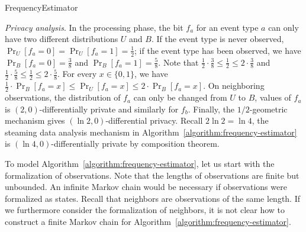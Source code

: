 \begin{algorithm}
  \begin{algorithmic}[1]
    \EndMatch
    \EndMatch
  \EndProcedure
  \end{algorithmic}
  \caption{FrequencyEstimator}
  \label{algorithm:frequency-estimator}
\end{algorithm}

\indent
\emph{Privacy analysis}.
In the processing phase, the bit $f_a$ for an event type $a$ can only
have two different distributions $U$ and $B$. If the event type is
never observed, $\Pr_U[f_a = 0] = \Pr_U[f_a = 1] = \frac{1}{2}$; if
the event type has been observed, we have $\Pr_B[f_a = 0] =
\frac{3}{8}$ and $\Pr_B[f_a = 1] = \frac{5}{8}$. Note that
$\frac{1}{2} \cdot \frac{3}{8} \leq \frac{1}{2} \leq 2 \cdot
\frac{3}{8}$ and $\frac{1}{2} \cdot \frac{5}{8} \leq \frac{1}{2} \leq
2 \cdot \frac{5}{8}$. For every $x \in \{ 0, 1 \}$, we have
$\frac{1}{2} \cdot \Pr_B[f_a = x] \leq \Pr_U[f_a = x] \leq 2 \cdot
\Pr_B[f_a = x]$. On neighboring observations, the distribution of
$f_a$ can only be changed from $U$ to $B$, values of $f_a$ is $(2,
0)$-differentially private and similarly for $f_b$. Finally, the
$1/2$-geometric mechanism gives $(\ln 2, 0)$-differential privacy.
Recall $2\ln 2 = \ln 4$,
the steaming data analysis mechanism in
Algorithm~\ref{algorithm:frequency-estimator} is $(\ln 4,
0)$-differentially private by
composition theorem.

To model Algorithm~\ref{algorithm:frequency-estimator}, let
us start with the formalization of observations. Note that the
lengths of observations are finite but unbounded. An infinite Markov
chain would be necessary if observations were formalized as states.
Recall that neighbors are observations of the same length. If we
furthermore consider the formalization of neighbors, it is not clear
how to construct a finite Markov chain for
Algorithm~\ref{algorithm:frequency-estimator}.

